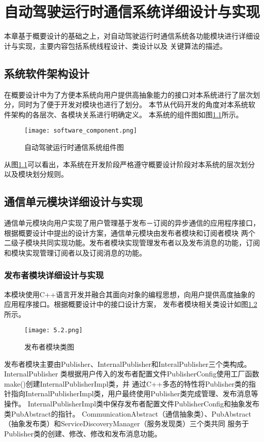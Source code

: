\chapter{自动驾驶运行时通信系统详细设计与实现}
本章基于概要设计的基础之上，对自动驾驶运行时通信系统各功能模块进行详细设计与实现，主要内容包括系统线程设计、类设计以及
关键算法的描述。

\section{系统软件架构设计}
在概要设计中为了方便本系统向用户提供高抽象能力的接口对本系统进行了层次划分，同时为了便于开发对模块也进行了划分。
本节从代码开发的角度对本系统软件架构的各层次、各模块关系进行明确定义。
本系统的组件图如图\ref{software_component}所示。
\begin{figure}[H]
    \centering
    \texttt{[image: software\_component.png]}
    \caption{自动驾驶运行时通信系统组件图}
    \label{software_component}
  \end{figure}
从图\ref{software_component}可以看出，本系统在开发阶段严格遵守概要设计阶段对本系统的层次划分以及模块划分规则。

\section{通信单元模块详细设计与实现}
通信单元模块向用户实现了用户管理基于发布－订阅的异步通信的应用程序接口，根据概要设计中提出的设计方案，通信单元模块由发布者模块和订阅者模块
两个二级子模块共同实现功能。发布者模块实现管理发布者以及发布消息的功能，订阅和模块实现管理订阅者以及订阅消息的功能。

\subsection{发布者模块详细设计与实现}
本模块使用C++语言开发并融合其面向对象的编程思想，向用户提供高度抽象的应用程序接口。根据概要设计中的接口设计方案，
发布者模块相关类设计如图\ref{publisher_class}所示。
\begin{figure}[H]
  \centering
  \texttt{[image: 5.2.png]}
  \caption{发布者模块类图}
  \label{publisher_class}
\end{figure}
发布者模块主要由Publisher、InternalPublisher和InteralPublisher三个类构成。InternalPublisher
类根据用户传入的发布者配置文件PublisherConfig使用工厂函数make()创建InternalPublisherImpl类，并
通过C++多态的特性将Publisher类的指针指向InternalPublisherImpl类，用户最终使用Publisher类完成管理、发布消息等操作。
InternalPublisherImpl类中保存发布者配置文件PublisherConfig和抽象发布类PubAbstract的指针。
CommunicationAbstract（通信抽象类）、PubAbstract（抽象发布类）和ServiceDiscoveryManager（服务发现类）三个类共同
服务于Publisher类的创建、修改、修改和发布消息功能。

